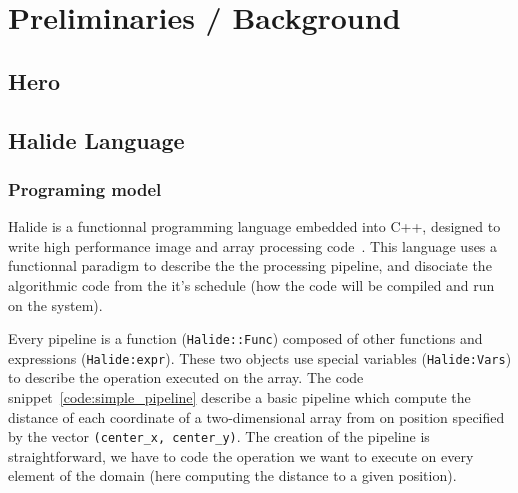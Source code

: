 
\chapter{Preliminaries / Background}
\section{Hero}
\section{Halide Language}
	\subsection { Programing model}
		Halide is a functionnal programming language embedded into C++, designed to write high performance image and array processing code~\cite{Web:Halide}. This language uses a functionnal paradigm to describe the the processing pipeline, and disociate the algorithmic code from the it's schedule (how the code will be compiled and run on the system). 


		Every pipeline is a function (\verb|Halide::Func|) composed of other functions and expressions (\verb|Halide:expr|). These two objects  use special variables (\verb|Halide:Vars|) to describe the operation executed on the array. The code snippet~\ref{code:simple_pipeline} 
		describe a basic pipeline which compute the distance of each coordinate of a two-dimensional array from on position specified by the vector \verb|(center_x, center_y)|. The creation of the pipeline is straightforward, we have to code the operation we want to execute on every element of the domain (here computing the distance to a given position).

